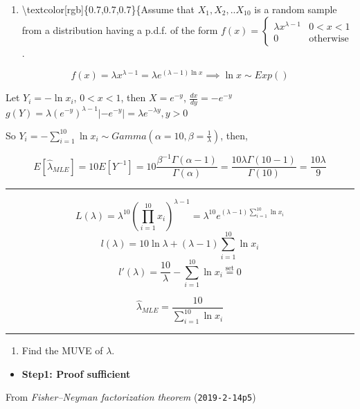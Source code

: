 \documentclass[12pt,]{article}
\title{}
\author{}
\date{}
\providecommand{\tightlist}{%
  \setlength{\itemsep}{0pt}\setlength{\parskip}{0pt}}
\begin{document}
\begin{enumerate}
\def\labelenumi{\arabic{enumi}.}
\tightlist
\item
  \textbackslash{}textcolor{[}rgb{]}\{0.7,0.7,0.7\}\{\textcolor[rgb]{0.7,0.7,0.7}{Assume that $X_1,X_2,..X_{10}$ is a random sample from a distribution having a p.d.f. of the form $f(x)=\begin{cases}\lambda x^{\lambda-1}& 0<x<1\\0&\text{otherwise}\end{cases}$.}
\end{enumerate}

\[f(x)=\lambda x^{\lambda-1}=\lambda e^{(\lambda-1)\ln x}\implies\ln x\sim Exp()\]

Let \(Y_i=-\ln x_i\), \(0<x<1\), then \(X=e^{-y}\),
\(\frac{dx}{dy}=-e^{-y}\)
\(g(Y)=\lambda(e^{-y})^{\lambda-1}|-e^{-y}|=\lambda e^{-\lambda y}, y>0\)

So
\(Y_i=-\sum_{i=1}^{10}\ln x_i\sim Gamma(\alpha=10,\beta=\frac1{\lambda})\),
then,

\[E[\hat\lambda_{MLE}]=10E[Y^{-1}]=10\frac{\beta^{-1}\Gamma(\alpha-1)}{\Gamma(\alpha)}=\frac{10\lambda\Gamma(10-1)}{\Gamma(10)}=\frac{10\lambda}{9}\]

\begin{center}\rule{0.5\linewidth}{\linethickness}\end{center}

\[L(\lambda)=\lambda^{10}(\prod_{i=1}^{10} x_i)^{\lambda-1}=\lambda^{10}e^{(\lambda-1)\sum^{10}_{i=1} \ln x_i}\]
\[l(\lambda)=10\ln\lambda+(\lambda-1)\sum^{10}_{i=1} \ln x_i\]
\[l'(\lambda)=\frac{10}\lambda-\sum^{10}_{i=1} \ln x_i\overset{\text{set}}{=}0\]

\[\hat\lambda_{MLE}=\frac{10}{\sum_{i=1}^{10}\ln x_i}\]

\begin{center}\rule{0.5\linewidth}{\linethickness}\end{center}

\begin{enumerate}
\def\labelenumi{\arabic{enumi}.}
\setcounter{enumi}{4}
\tightlist
\item
  \textcolor[rgb]{0.7,0.7,0.7}{Find the MUVE of $\lambda$.}
\end{enumerate}

\begin{itemize}
\tightlist
\item
  \textbf{Step1: Proof sufficient}
\end{itemize}

From \emph{Fisher--Neyman factorization theorem} (\texttt{2019-2-14p5})
\end{document}
